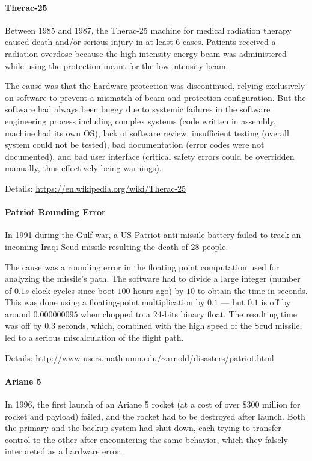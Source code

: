\paragraph{Therac-25}
Between 1985 and 1987, the Therac-25 machine for medical radiation therapy caused death and/or serious injury in at least $6$ cases.
Patients received a radiation overdose because the high intensity energy beam was administered while using the protection meant for the low intensity beam.

The cause was that the hardware protection was discontinued, relying exclusively on software to prevent a mismatch of beam and protection configuration.
But the software had always been buggy due to systemic failures in the software engineering process including complex systems (code written in assembly, machine had its own OS), lack of software review, insufficient testing (overall system could not be tested), bad documentation (error codes were not documented), and bad user interface (critical safety errors could be overridden manually, thus effectively being warnings).

Details: \url{https://en.wikipedia.org/wiki/Therac-25}

\paragraph{Patriot Rounding Error}
In 1991 during the Gulf war, a US Patriot anti-missile battery failed to track an incoming Iraqi Scud missile resulting the death of 28 people.

The cause was a rounding error in the floating point computation used for analyzing the missile's path.
The software had to divide a large integer (number of $0.1s$ clock cycles since boot $100$ hours ago) by $10$ to obtain the time in seconds.
This was done using a floating-point multiplication by $0.1$ --- but $0.1$ is off by around $0.000000095$ when chopped to a $24$-bits binary float.
The resulting time was off by $0.3$ seconds, which, combined with the high speed of the Scud missile, led to a serious miscalculation of the flight path.

Details: \url{http://www-users.math.umn.edu/~arnold/disasters/patriot.html}

\paragraph{Ariane 5}
In 1996, the first launch of an Ariane 5 rocket (at a cost of over \$$300$ million for rocket and payload) failed, and the rocket had to be destroyed after launch.
Both the primary and the backup system had shut down, each trying to transfer control to the other after encountering the same behavior, which they falsely interpreted as a hardware error.


